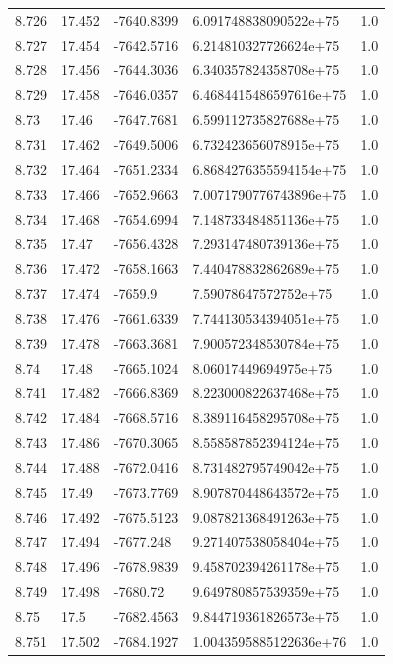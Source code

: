 \begin{tabular}{lllll}
8.726 & 17.452 & -7640.8399 & 6.091748838090522e+75 & 1.0 \\
8.727 & 17.454 & -7642.5716 & 6.214810327726624e+75 & 1.0 \\
8.728 & 17.456 & -7644.3036 & 6.340357824358708e+75 & 1.0 \\
8.729 & 17.458 & -7646.0357 & 6.4684415486597616e+75 & 1.0 \\
8.73 & 17.46 & -7647.7681 & 6.599112735827688e+75 & 1.0 \\
8.731 & 17.462 & -7649.5006 & 6.732423656078915e+75 & 1.0 \\
8.732 & 17.464 & -7651.2334 & 6.8684276355594154e+75 & 1.0 \\
8.733 & 17.466 & -7652.9663 & 7.0071790776743896e+75 & 1.0 \\
8.734 & 17.468 & -7654.6994 & 7.148733484851136e+75 & 1.0 \\
8.735 & 17.47 & -7656.4328 & 7.293147480739136e+75 & 1.0 \\
8.736 & 17.472 & -7658.1663 & 7.440478832862689e+75 & 1.0 \\
8.737 & 17.474 & -7659.9 & 7.59078647572752e+75 & 1.0 \\
8.738 & 17.476 & -7661.6339 & 7.744130534394051e+75 & 1.0 \\
8.739 & 17.478 & -7663.3681 & 7.900572348530784e+75 & 1.0 \\
8.74 & 17.48 & -7665.1024 & 8.06017449694975e+75 & 1.0 \\
8.741 & 17.482 & -7666.8369 & 8.223000822637468e+75 & 1.0 \\
8.742 & 17.484 & -7668.5716 & 8.389116458295708e+75 & 1.0 \\
8.743 & 17.486 & -7670.3065 & 8.558587852394124e+75 & 1.0 \\
8.744 & 17.488 & -7672.0416 & 8.731482795749042e+75 & 1.0 \\
8.745 & 17.49 & -7673.7769 & 8.907870448643572e+75 & 1.0 \\
8.746 & 17.492 & -7675.5123 & 9.087821368491263e+75 & 1.0 \\
8.747 & 17.494 & -7677.248 & 9.271407538058404e+75 & 1.0 \\
8.748 & 17.496 & -7678.9839 & 9.458702394261178e+75 & 1.0 \\
8.749 & 17.498 & -7680.72 & 9.649780857539359e+75 & 1.0 \\
8.75 & 17.5 & -7682.4563 & 9.844719361826573e+75 & 1.0 \\
8.751 & 17.502 & -7684.1927 & 1.0043595885122636e+76 & 1.0 \\

\end{tabular}
